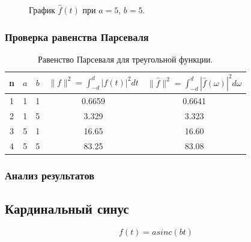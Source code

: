 \documentclass[a5paper, 10pt]{article}
\theoremstyle{definition}
\theoremstyle{plain}
\theoremstyle{remark}
\begin{document}
\begin{figure}[h!]
\caption{График $\hat{f}(t)$ при $a = 5$, $b = 5$.}
\end{figure}




\subsubsection{Проверка равенства Парсеваля}

\begin{table}[h!]
\caption{Равенство Парсеваля для треугольной функции.}
\label{tabular:timesandtenses}
\begin{center}
\begin{tabular}{|c|c|c|c|c|}
\hline
n & $a$ & $b$ & $\| f \|^2 = \int_{-d}^d |f(t)|^2 dt $ & $\| \hat{f} \|^2 = \int_{-d}^d |\hat{f}(\omega)|^2 d\omega $ \\
\hline
1 & 1 & 1 &  0.6659& 0.6641\\
\hline
2 & 1 & 5 & 3.329  & 3.323\\
\hline
3 & 5 & 1 & 16.65 &  16.60\\
\hline
4 & 5 & 5 & 83.25 & 83.08 \\
\hline
\end{tabular}
\end{center}
\end{table}



\subsubsection{Анализ результатов}



\newpage
\subsection{Кардинальный синус}
\begin{equation}
f(t) = a sinc(bt)
\end{equation}
\end{document}
